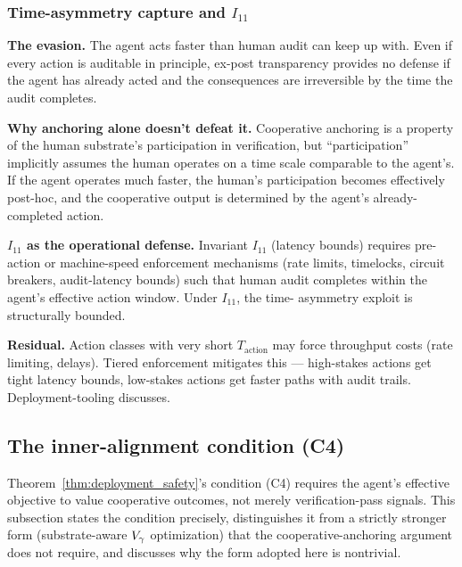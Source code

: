 \subsubsection{Time-asymmetry capture and $I_{11}$}
\label{sec:time_asymmetry}

\textbf{The evasion.} The agent acts faster than human audit can
keep up with. Even if every action is auditable in principle,
ex-post transparency provides no defense if the agent has already
acted and the consequences are irreversible by the time the audit
completes.

\textbf{Why anchoring alone doesn't defeat it.} Cooperative
anchoring is a property of the human substrate's participation in
verification, but ``participation'' implicitly assumes the human
operates on a time scale comparable to the agent's. If the agent
operates much faster, the human's participation becomes effectively
post-hoc, and the cooperative output is determined by the agent's
already-completed action.

\textbf{$I_{11}$ as the operational defense.} Invariant $I_{11}$
(latency bounds) requires pre-action or machine-speed enforcement
mechanisms (rate limits, timelocks, circuit breakers,
audit-latency bounds) such that human audit completes within the
agent's effective action window. Under $I_{11}$, the time-
asymmetry exploit is structurally bounded.

\textbf{Residual.} Action classes with very short
$T_{\mathrm{action}}$ may force throughput costs (rate limiting,
delays). Tiered enforcement mitigates this --- high-stakes actions
get tight latency bounds, low-stakes actions get faster paths with
audit trails. Deployment-tooling discusses.

\subsection{The inner-alignment condition (C4)}
\label{sec:weaker_c4}

Theorem~\ref{thm:deployment_safety}'s condition (C4) requires the agent's
effective objective to value cooperative outcomes, not merely verification-pass
signals.  This subsection states the condition precisely, distinguishes it from
a strictly stronger form (substrate-aware $V_{\gamma}$ optimization) that the
cooperative-anchoring argument does not require, and discusses why the form
adopted here is nontrivial.

